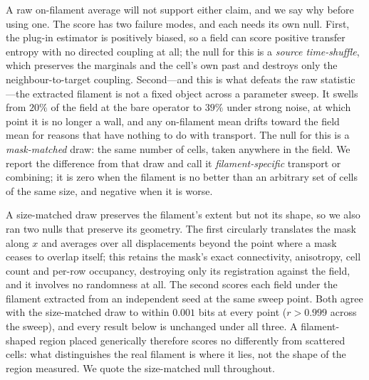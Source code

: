 \documentclass[man,12pt,floatsintext,donotrepeattitle]{apa7}
\begin{document}
A raw on-filament average will not support either claim, and we say why before
using one. The score has two failure modes, and each needs its own null. First,
the plug-in estimator is positively biased, so a field can score positive
transfer entropy with no directed coupling at all; the null for this is a
\emph{source time-shuffle}, which preserves the marginals and the cell's own
past and destroys only the neighbour-to-target coupling. Second---and this is
what defeats the raw statistic---the extracted filament is not a fixed object
across a parameter sweep. It swells from $20\%$ of the field at the bare
operator to $39\%$ under strong noise, at which
point it is no longer a wall, and any on-filament mean drifts toward the field
mean for reasons that have nothing to do with transport. The null for this is a
\emph{mask-matched} draw: the same number of cells, taken anywhere in the
field. We report the difference from that draw and call it \emph{filament-specific}
transport or combining; it is zero when the filament is no better than an
arbitrary set of cells of the same size, and negative when it is worse.

A size-matched draw preserves the filament's extent but not its shape, so we
also ran two nulls that preserve its geometry. The first circularly translates
the mask along $x$ and averages over all displacements beyond the point where a
mask ceases to overlap itself; this retains the mask's exact connectivity,
anisotropy, cell count and per-row occupancy, destroying only its registration
against the field, and it involves no randomness at all. The second scores each
field under the filament extracted from an independent seed at the same sweep
point. Both agree with the size-matched draw to within $0.001$ bits at every
point ($r > 0.999$ across the sweep), and every result below is unchanged under
all three. A filament-shaped region placed generically therefore scores no
differently from scattered cells: what distinguishes the real filament is where
it lies, not the shape of the region measured. We quote the size-matched null
throughout.
\end{document}
